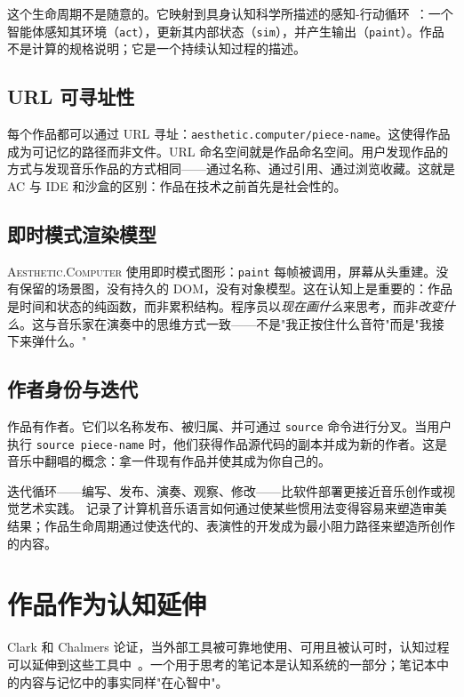 \documentclass[10pt,letterpaper,twocolumn]{article}
\newcommand{\ac}{\textsc{Aesthetic.Computer}}
\begin{document}
这个生命周期不是随意的。它映射到具身认知科学所描述的感知-行动循环~\citep{varela1991embodied}：一个智能体感知其环境（\texttt{act}），更新其内部状态（\texttt{sim}），并产生输出（\texttt{paint}）。作品不是计算的规格说明；它是一个持续认知过程的描述。

\subsection{URL 可寻址性}

每个作品都可以通过 URL 寻址：\texttt{aesthetic.computer/piece-name}。这使得作品成为可记忆的路径而非文件。URL 命名空间就是作品命名空间。用户发现作品的方式与发现音乐作品的方式相同——通过名称、通过引用、通过浏览收藏。这就是 AC 与 IDE 和沙盒的区别：作品在技术之前首先是社会性的。

\subsection{即时模式渲染模型}

\ac{} 使用即时模式图形：\texttt{paint} 每帧被调用，屏幕从头重建。没有保留的场景图，没有持久的 DOM，没有对象模型。这在认知上是重要的：作品是时间和状态的纯函数，而非累积结构。程序员以\emph{现在画什么}来思考，而非\emph{改变什么}。这与音乐家在演奏中的思维方式一致——不是"我正按住什么音符"而是"我接下来弹什么。"

\subsection{作者身份与迭代}

作品有作者。它们以名称发布、被归属、并可通过 \texttt{source} 命令进行分叉。当用户执行 \texttt{source piece-name} 时，他们获得作品源代码的副本并成为新的作者。这是音乐中翻唱的概念：拿一件现有作品并使其成为你自己的。

迭代循环——编写、发布、演奏、观察、修改——比软件部署更接近音乐创作或视觉艺术实践。\citet{mcpherson2020idiomatic} 记录了计算机音乐语言如何通过使某些惯用法变得容易来塑造审美结果；作品生命周期通过使迭代的、表演性的开发成为最小阻力路径来塑造所创作的内容。

\section{作品作为认知延伸}

Clark 和 Chalmers 论证，当外部工具被可靠地使用、可用且被认可时，认知过程可以延伸到这些工具中~\citep{clark1998extended}。一个用于思考的笔记本是认知系统的一部分；笔记本中的内容与记忆中的事实同样"在心智中"。
\end{document}

